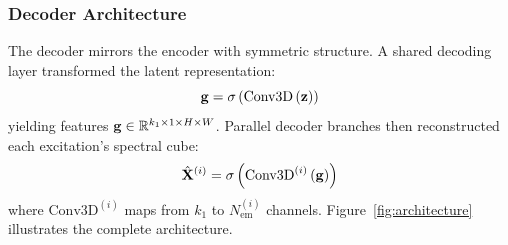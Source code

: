 \subsubsection{Decoder Architecture}
The decoder mirrors the encoder with symmetric structure.
A shared decoding layer transformed the latent representation:
\begin{equation}
\mathbf{g} = \sigma\left(\text{Conv3D}\left(\mathbf{z}\right)\right)
\label{eq:decode_shared}
\end{equation}
yielding features $\mathbf{g} \in \mathbb{R}^{k_1 \times 1 \times H \times W}$.
Parallel decoder branches then reconstructed each excitation's spectral cube:
\begin{equation}
\hat{\mathbf{X}}^{(i)} = \sigma\left(\text{Conv3D}^{(i)}\left(\mathbf{g}\right)\right)
\label{eq:decode_branch}
\end{equation}
where $\text{Conv3D}^{(i)}$ maps from $k_1$ to $N_{\text{em}}^{(i)}$ channels.
Figure~\ref{fig:architecture} illustrates the complete architecture.

